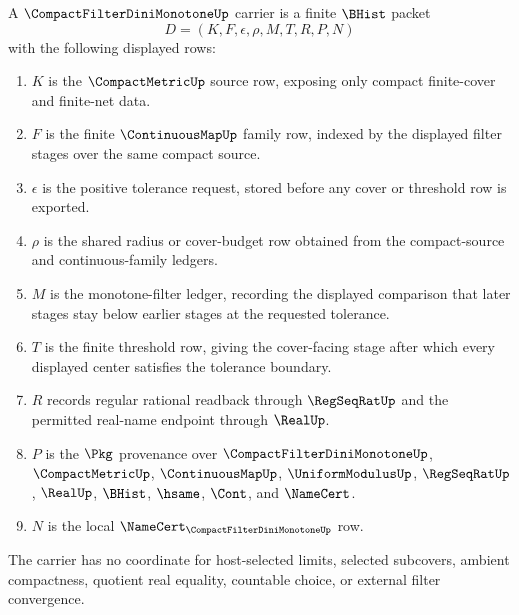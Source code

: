 \begin{definition}
\label{def:compact-filter-dini-monotone-carrier}
A $\CompactFilterDiniMonotoneUp$ carrier is a finite $\BHist$ packet
$$
D=(K,F,\epsilon,\rho,M,T,R,P,N)
$$
with the following displayed rows:
\begin{enumerate}
\item $K$ is the $\CompactMetricUp$ source row, exposing only compact finite-cover and finite-net data.
\item $F$ is the finite $\ContinuousMapUp$ family row, indexed by the displayed filter stages over the same compact source.
\item $\epsilon$ is the positive tolerance request, stored before any cover or threshold row is exported.
\item $\rho$ is the shared radius or cover-budget row obtained from the compact-source and continuous-family ledgers.
\item $M$ is the monotone-filter ledger, recording the displayed comparison that later stages stay below earlier stages at the requested tolerance.
\item $T$ is the finite threshold row, giving the cover-facing stage after which every displayed center satisfies the tolerance boundary.
\item $R$ records regular rational readback through $\RegSeqRatUp$ and the permitted real-name endpoint through $\RealUp$.
\item $P$ is the $\Pkg$ provenance over $\CompactFilterDiniMonotoneUp$, $\CompactMetricUp$, $\ContinuousMapUp$, $\UniformModulusUp$, $\RegSeqRatUp$, $\RealUp$, $\BHist$, $\hsame$, $\Cont$, and $\NameCert$.
\item $N$ is the local $\NameCert_{\CompactFilterDiniMonotoneUp}$ row.
\end{enumerate}
The carrier has no coordinate for host-selected limits, selected subcovers, ambient compactness, quotient real equality, countable choice, or external filter convergence.
\end{definition}

